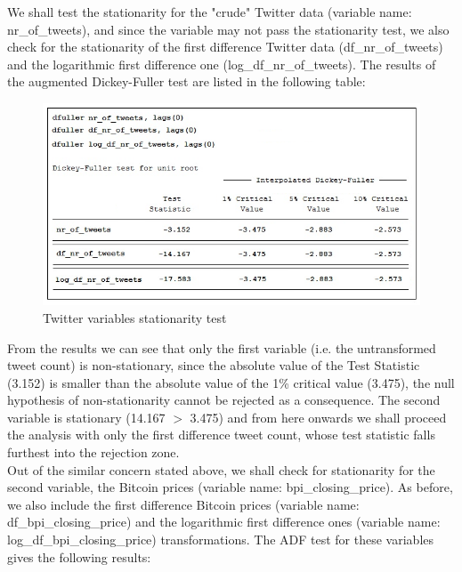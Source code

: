 \documentclass[a4paper,american,12pt]{article}
\begin{document}
\begin{spacing}{1.2}
We shall test the stationarity for the "crude" Twitter data (variable name: nr\_of\_tweets), and since the variable may not pass the stationarity test, we also check for the stationarity of the first difference Twitter data (df\_nr\_of\_tweets) and the logarithmic first difference one (log\_df\_nr\_of\_tweets). The results of the augmented Dickey-Fuller test are listed in the following table:\\

\begin{figure}[H]
\centering
\includegraphics[scale=0.85]{stata_export_graphs/ADF_twitter_variables.png}
\caption{Twitter variables stationarity test}
\label{fig:3}
\end{figure}
	
From the results we can see that only the first variable (i.e. the untransformed tweet count) is non-stationary, since the absolute value of the Test Statistic (3.152) is smaller than the absolute value of the 1\% critical value (3.475), the null hypothesis of non-stationarity cannot be rejected as a consequence. The second variable is stationary (14.167 $>$ 3.475) and from here onwards we shall proceed the analysis with only the first difference tweet count, whose test statistic falls furthest into the rejection zone.\\

Out of the similar concern stated above, we shall check for stationarity for the second variable, the Bitcoin prices (variable name: bpi\_closing\_price). As before, we also include the first difference Bitcoin prices (variable name: df\_bpi\_closing\_price) and the logarithmic first difference ones (variable name: log\_df\_bpi\_closing\_price) transformations. The ADF test for these variables gives the following results:\\


\end{spacing}
\end{document}
